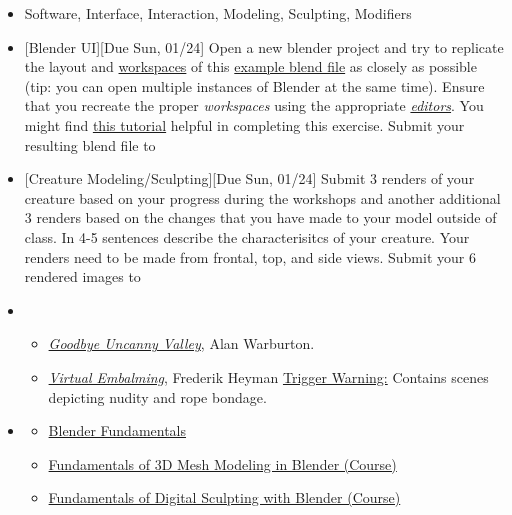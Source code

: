 \def\dMon{Mon, 01/18}
\def\dTues{Tues, 01/19}
\def\dWed{Wed, 01/20}
\def\dThur{Thur, 01/21}
\def\dFri{Fri, 01/22}
\def\dSat{Sat, 01/23}
\def\dSun{Sun, 01/24}
\placeDate

\begin{itemize}[noitemsep,topsep=0pt,leftmargin=*]
      \item {} Software, Interface, Interaction, Modeling, Sculpting, Modifiers
      \item {}[Blender UI][Due \dSun] Open a new blender project and try to replicate the layout and \href{https://docs.blender.org/manual/en/latest/interface/window_system/workspaces.html}{workspaces} of this \href{supplements/3001-Ex1.blend}{example blend file} as closely as possible (tip: you can open multiple instances of Blender at the same time). Ensure that you recreate the proper \emph{workspaces} using the appropriate \href{https://docs.blender.org/manual/en/latest/editors/index.html}{\emph{editors}}. You might find \href{https://youtu.be/7DNmaR7TKwU}{this tutorial} helpful in completing this exercise. Submit your resulting blend file to \discordE
      \item {}[Creature Modeling/Sculpting][Due \dSun] Submit 3 renders of your creature based on your progress during the workshops and another additional 3 renders based on the changes that you have made to your model outside of class. In 4-5 sentences describe the characterisitcs of your creature. Your renders need to be made from frontal, top, and side views. Submit your 6 rendered images to \discordE
      \item {}
            \begin{itemize}
                  \item \href{https://alanwarburton.co.uk/goodbye-uncanny-valley}{\emph{Goodbye Uncanny Valley}}, Alan Warburton.
                  \item \href{https://www.nowness.com/story/virtual-embalming-frederik-heyman}{\emph{Virtual Embalming}}, Frederik Heyman \newline
                        \small{\ul{Trigger Warning:} Contains scenes depicting nudity and rope bondage.}
            \end{itemize}
      \item {}
            \begin{resenv}
                  \begin{itemize}
                        \item \href{https://cloud.blender.org/p/blender-fundamentals/}{Blender Fundamentals}
                        \item \href{http://bit.ly/39jpRN5}{Fundamentals of 3D Mesh Modeling in Blender (Course)}
                        \item \href{http://bit.ly/38urSXu}{Fundamentals of Digital Sculpting with Blender (Course)}
                  \end{itemize}
            \end{resenv}
\end{itemize}